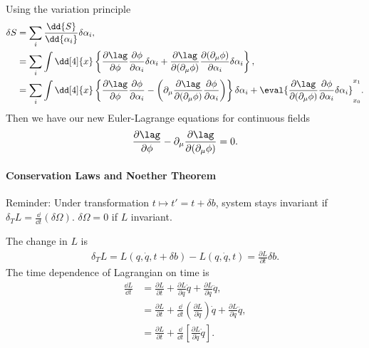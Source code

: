 Using the variation principle
\begin{align*}
   \delta S &= \sum_i \frac{\dd{S}}{\dd{\alpha_i}} \delta \alpha_i, \\
            &= \sum_i \int \dd[4]{x} \left\{ \frac{\partial \lag}{\partial \phi} \frac{\partial \phi}{\partial \alpha_i} \delta \alpha_i + \frac{\partial \lag}{\partial (\partial_\mu \phi)} \frac{\partial (\partial_\mu \phi)}{\partial \alpha_i} \delta \alpha_i \right\}, \\
            &= \sum_i \int \dd[4]{x} \left\{ \frac{\partial \lag}{\partial \phi} \frac{\partial \phi}{\partial \alpha_i} - \left( \partial_\mu \frac{\partial \lag}{\partial (\partial_\mu \phi)} \frac{\partial \phi}{\partial \alpha_i} \right) \right\}\delta \alpha_i + \eval{\frac{\partial \lag}{\partial (\partial_\mu \phi)} \frac{\partial \phi}{\partial \alpha_i} \delta\alpha_i}_{x_0}^{x_1}.
\end{align*}
Then we have our new Euler-Lagrange equations for continuous fields
\begin{align}
   \frac{\partial \lag}{\partial \phi} - \partial_\mu \frac{\partial \lag}{\partial(\partial_\mu \phi)} = 0.
\end{align}

\paragraph{Conservation Laws and Noether Theorem}
Reminder: Under transformation $t \mapsto t' = t + \delta b$, system stays invariant if $\delta_T L = \frac{\dd}{\dd{t}}(\delta \Omega)$.
$\delta \Omega = 0$ if $L$ invariant.

The change in $L$ is 
\begin{align*}
   \delta_T L = L(q, \dot{q}, t+\delta b) - L (q, \dot{q}, t) = \frac{\partial L}{\partial t} \delta b.
\end{align*}
The time dependence of Lagrangian on time is
\begin{align*}
   \frac{\dd{L}}{\dd{t}} &= \frac{\partial L}{\partial t} + \frac{\partial L}{\partial q} \dot{q} + \frac{\partial L}{\partial \dot{q}} \ddot{q}, \\
                         &= \frac{\partial L}{\partial t} + \frac{\dd}{\dd{t}} \left (\frac{\partial L}{\partial \dot{q}} \right) \dot{q} + \frac{\partial L}{\partial \dot{q}} \ddot{q}, \\
                         &= \frac{\partial L}{\partial t} + \frac{\dd}{\dd{t}} \left[ \frac{\partial L}{\partial \dot{q}} \dot{q} \right]. \\
\end{align*}


